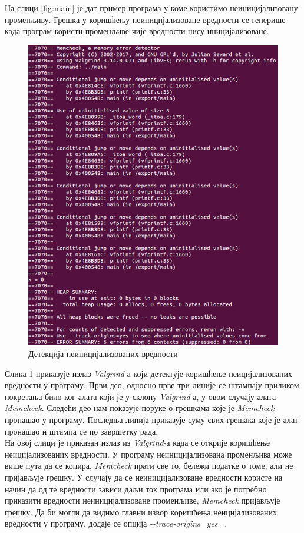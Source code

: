\documentclass[12pt,oneside]{memoir}
\begin{document}
\indent На слици \ref{fig:main} је дат пример програма у коме користимо неиницијализовану променљиву. Грешка у коришћењу неиницијализоване вредности се генерише када програм користи променљиве чије вредности нису иницијализоване.

\begin{figure}[h!]
\begin{center}
\includegraphics[scale=0.75]{slika2.png}
\end{center}
\caption{Детекција неиницијализованих вредности}
\label{fig:memcheck}
\end{figure}

\indent Слика \ref{fig:memcheck} приказује излаз \textit{Valgrind}-а који детектује коришћење неицијализованих вредности у програму. Први део, односно прве три линије се штампају приликом покретања било ког алата који је у склопу \textit{Valgrind}-а, у овом случају алата \textit{Memcheck}. Следећи део нам показује поруке о грешкама које је \textit{Memcheck} пронашао у програму. Последња линија приказује суму свих грешака које је алат пронашао и штампа се по завршетку рада. \\
\indent На овој слици је приказан излаз из \textit{Valgrind}-а када се открије  коришћење неицијализованих вредности. У програму неиницијализована променљива може више пута да се копира, \textit{Memcheck} прати све то, бележи податке о томе, али не пријављује грешку. У случају да се неиницијализоване вредности користе на начин да од те вредности зависи даљи ток програма или ако је потребно приказити вредности неиницијализоване променљиве, \textit{Memcheck} пријављује грешку. Да би могли да видимо главни извор коришћења неицијализованих вредности у програму, додаје се опција \textit{-\--trace-origins=yes} ~\cite{memcheckRef}.
\end{document}
